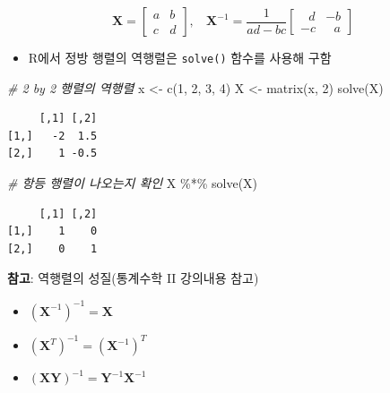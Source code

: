 \documentclass[
  11pt,
]{krantz}
\makeatletter
\newenvironment{Shaded}{\begin{snugshade}}{\end{snugshade}}
\newcommand{\CommentTok}[1]{\textcolor[rgb]{0.37,0.37,0.37}{\textit{#1}}}
\newcommand{\DecValTok}[1]{\textcolor[rgb]{0.06,0.06,0.06}{#1}}
\newcommand{\FunctionTok}[1]{\textcolor[rgb]{0,0,0}{#1}}
\newcommand{\NormalTok}[1]{#1}
\newcommand{\OtherTok}[1]{\textcolor[rgb]{0.37,0.37,0.37}{#1}}
\newcommand{\SpecialCharTok}[1]{\textcolor[rgb]{0,0,0}{#1}}
\providecommand{\tightlist}{%
  \setlength{\itemsep}{0pt}\setlength{\parskip}{0pt}}
\newenvironment{kframe}{%
\medskip{}
\setlength{\fboxsep}{.8em}
 \def\at@end@of@kframe{}%
 \ifinner\ifhmode%
  \def\at@end@of@kframe{\end{minipage}}%
  \begin{minipage}{\columnwidth}%
 \fi\fi%
 \def\FrameCommand##1{\hskip\@totalleftmargin \hskip-\fboxsep
 \colorbox{shadecolor}{##1}\hskip-\fboxsep
     \hskip-\linewidth \hskip-\@totalleftmargin \hskip\columnwidth}%
 \MakeFramed {\advance\hsize-\width
   \@totalleftmargin\z@ \linewidth\hsize
   \@setminipage}}%
 {\par\unskip\endMakeFramed%
 \at@end@of@kframe}
\newenvironment{rmdblock}[1]
  {
  \begin{itemize}
  \renewcommand{\labelitemi}{
    \raisebox{-.7\height}[0pt][0pt]{
      {\setkeys{Gin}{width=3em,keepaspectratio}\texttt{[image: images/\#1]}}
    }
  }
  \setlength{\fboxsep}{1em}
  \begin{kframe}
  \item
  }
  {
  \end{kframe}
  \end{itemize}
  }
\newenvironment{rmdtip}
  {\begin{rmdblock}{tip}}
  {\end{rmdblock}}
\makeatother
\begin{document}
\[\mathrm{\mathbf{X}} = 
 \begin{bmatrix}
 a & b \\
 c & d 
 \end{bmatrix}, ~~~~
 \mathrm{\mathbf{X}}^{-1} = 
 \frac{1}{ad - bc}
 \begin{bmatrix}
~~~d &  -b \\
  -c &~~~a
 \end{bmatrix}
\]

\begin{itemize}
\tightlist
\item
  R에서 정방 행렬의 역행렬은 \texttt{solve()} 함수를 사용해 구함
\end{itemize}

\footnotesize

\begin{Shaded}
\begin{Highlighting}[]
\CommentTok{\# 2 by 2 행렬의 역행렬}
\NormalTok{x }\OtherTok{\textless{}{-}} \FunctionTok{c}\NormalTok{(}\DecValTok{1}\NormalTok{, }\DecValTok{2}\NormalTok{, }\DecValTok{3}\NormalTok{, }\DecValTok{4}\NormalTok{)}
\NormalTok{X }\OtherTok{\textless{}{-}} \FunctionTok{matrix}\NormalTok{(x, }\DecValTok{2}\NormalTok{)}
\FunctionTok{solve}\NormalTok{(X)}
\end{Highlighting}
\end{Shaded}

\begin{verbatim}
     [,1] [,2]
[1,]   -2  1.5
[2,]    1 -0.5
\end{verbatim}

\begin{Shaded}
\begin{Highlighting}[]
\CommentTok{\# 항등 행렬이 나오는지 확인}
\NormalTok{X }\SpecialCharTok{\%*\%} \FunctionTok{solve}\NormalTok{(X)}
\end{Highlighting}
\end{Shaded}

\begin{verbatim}
     [,1] [,2]
[1,]    1    0
[2,]    0    1
\end{verbatim}

\normalsize

\footnotesize

\begin{rmdtip}
\textbf{참고}: 역행렬의 성질(통계수학 II 강의내용 참고)

\begin{itemize}
\tightlist
\item
  \((\mathrm{\mathbf{X}}^{-1})^{-1} = \mathrm{\mathbf{X}}\)
\item
  \((\mathrm{\mathbf{X}}^T)^{-1} = (\mathrm{\mathbf{X}}^{-1})^T\)
\item
  \((\mathrm{\mathbf{XY}})^{-1} = \mathrm{\mathbf{Y}}^{-1}\mathrm{\mathbf{X}}^{-1}\)
\end{itemize}
\end{rmdtip}
\end{document}
